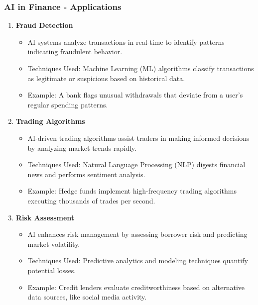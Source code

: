 \documentclass{beamer}
\begin{document}
\begin{frame}[fragile]
    \frametitle{AI in Finance - Applications}
    \begin{enumerate}
        \item \textbf{Fraud Detection}
            \begin{itemize}
                \item AI systems analyze transactions in real-time to identify patterns indicating fraudulent behavior.
                \item Techniques Used: Machine Learning (ML) algorithms classify transactions as legitimate or suspicious based on historical data.
                \item Example: A bank flags unusual withdrawals that deviate from a user’s regular spending patterns.
            \end{itemize}
        
        \item \textbf{Trading Algorithms}
            \begin{itemize}
                \item AI-driven trading algorithms assist traders in making informed decisions by analyzing market trends rapidly.
                \item Techniques Used: Natural Language Processing (NLP) digests financial news and performs sentiment analysis.
                \item Example: Hedge funds implement high-frequency trading algorithms executing thousands of trades per second.
            \end{itemize}
        
        \item \textbf{Risk Assessment}
            \begin{itemize}
                \item AI enhances risk management by assessing borrower risk and predicting market volatility.
                \item Techniques Used: Predictive analytics and modeling techniques quantify potential losses.
                \item Example: Credit lenders evaluate creditworthiness based on alternative data sources, like social media activity.
            \end{itemize}
    \end{enumerate}
\end{frame}
\end{document}

